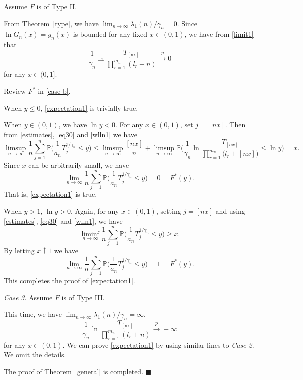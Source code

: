 \documentclass[11pt]{article}
\numberwithin{equation}{section}
\begin{document}
\vspace{10pt}

 Assume $F$ is of Type II.

From Theorem~\ref{type}, we have
$\lim_{n\to\infty}\lambda_1(n)/\gamma_n=0$.   Since $\ln
G_n(x)=g_n(x)$ is bounded for any fixed $x\in (0,1)$, we have from
\eqref{limit1} that
\begin{equation}\label{wlln1}
\frac{1}{\gamma_n}\ln
\frac{T_{[\mathrm{nx}]}}{\prod_{r=1}^{m_n}(l_r+n)}\overset{p}\to 0
\end{equation}
for any $x\in (0,1]$.

Review $F^*$ in \eqref{case-b}.

When $y\le 0$,  \eqref{expectation1} is trivially true.

When $y\in (0,1)$, we have $\ln y<0$. For any $x\in (0,1)$, set
$j=[nx]$.  Then from \eqref{estimates}, \eqref{eq30} and
\eqref{wlln1} we have
\[
\limsup_{n \rightarrow \infty}  \frac{1}{n} \sum_{j=1}^{n}
\mathbb{P}\Big(\frac{1}{a_n}T_j^{1 / \gamma_{n}} \leq y\Big)\leq
\limsup _{n \rightarrow \infty}  \frac{[nx]}{n}+ \limsup _{n
\rightarrow \infty}  \mathbb{P}\Big(\frac{1}{\gamma_{n}} \ln
\frac{T_{[nx]}}{\prod_{r=1}^{m_{n}}\Big(l_{r}+[nx]\Big)}\le\ln
y\Big)=x.
\]
Since $x$ can be arbitrarily small, we have
\[
\lim_{n \rightarrow \infty}  \frac{1}{n} \sum_{j=1}^{n}
\mathbb{P}\Big(\frac{1}{a_n}T_j^{1 / \gamma_{n}} \leq
y\Big)=0=F^*(y).
\]
That is, \eqref{expectation1} is true.

When $y>1$, $\ln y>0$. Again,  for any $x\in (0,1)$, setting
$j=[nx]$ and using \eqref{estimates}, \eqref{eq30} and
\eqref{wlln1}, we have
\[
\liminf_{n\to\infty}\frac{1}{n} \sum_{j=1}^{n}
\mathbb{P}\Big(\frac{1}{a_{n}} T_{j}^{1 / \gamma_{n}} \leqslant
y\Big)\ge x.
\]
By letting $x\uparrow 1$ we have
\[
\lim_{n\to\infty}\frac{1}{n} \sum_{j=1}^{n}
\mathbb{P}\Big(\frac{1}{a_{n}} T_{j}^{1 / \gamma_{n}} \leqslant
y\Big)=1=F^*(y).
\]
This completes the proof of \eqref{expectation1}.

\noindent\underline{\textit{Case 3}}.  Assume $F$ is of Type III.

This time, we have $\lim_{n\to\infty}\lambda_1(n)/\gamma_n=\infty$.
\[
\frac{1}{\gamma_n}\ln
\frac{T_{[\mathrm{nx}]}}{\prod_{r=1}^{m_n}(l_r+n)}\overset{p}\to
-\infty
\]
for any $x\in (0,1)$. We can prove \eqref{expectation1} by using
similar lines to \textit{Case 2}. We omit the details.

The proof of Theorem~\ref{general} is completed.
\hfill$\blacksquare$
\end{document}
